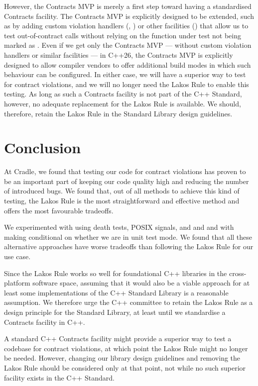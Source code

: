 However, the Contracts MVP is merely a first step toward having a standardised Contracts facility. The Contracts MVP is explicitly designed to be extended, such as by adding custom violation handlers (\cite{P2698R0}, \cite{P2811R0}) or other facilities (\cite{P2784R0}) that allow us to test out-of-contract calls without relying on the function under test not being marked as . Even if we get only the Contracts MVP --- without custom violation handlers or similar facilities --- in C++26, the Contracts MVP is explicitly designed to allow compiler vendors to offer additional build modes in which such behaviour can be configured. In either case, we will have a superior way to test for contract violations, and we will no longer need the Lakos Rule to enable this testing. As long as such a Contracts facility is not part of the C++ Standard, however, no adequate replacement for the Lakos Rule is available. We should, therefore, retain the Lakos Rule in the Standard Library design guidelines.

\section{Conclusion}
At Cradle, we found that testing our code for contract violations has proven to be an important part of keeping our code quality high and reducing the number of introduced bugs. We found that, out of all methods to achieve this kind of testing, the Lakos Rule is the most straightforward and effective method and offers the most favourable tradeoffs. 

We experimented with using death tests, POSIX signals, and  and  and with making  conditional on whether we are in unit test mode. We found that all these alternative approaches have worse tradeoffs than following the Lakos Rule for our use case.

Since the Lakos Rule works so well for foundational C++ libraries in the cross-platform software space, assuming that it would also be a viable approach for at least some implementations of the C++ Standard Library is a reasonable assumption. We therefore urge the C++ committee to retain the Lakos Rule as a design principle for the Standard Library, at least until we standardise a Contracts facility in C++.

A standard C++ Contracts facility might provide a superior way to test a codebase for contract violations, at which point the Lakos Rule might no longer be needed. However, changing our library design guidelines and removing the Lakos Rule should be considered only at that point, not while no such superior facility exists in the C++ Standard.



\renewcommand{\bibname}{References}



